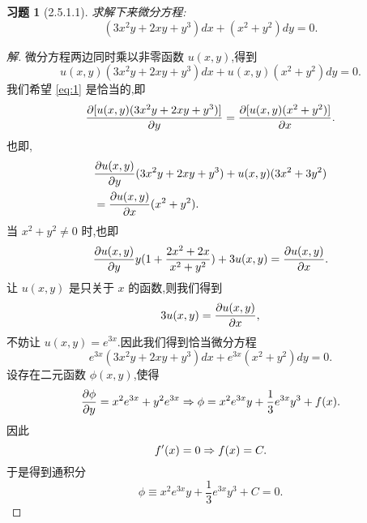 \documentclass[a4paper, 12pt]{article} %
\newtheorem*{cdtheorem}{习题}
\newenvironment{exercise}
{\bigskip\begin{mdframed}[backgroundcolor=gray!40,rightline=false,leftline=false,topline=false,bottomline=false]\begin{cdtheorem}}
    {\end{cdtheorem}\end{mdframed}\bigskip}
\begin{document}
\begin{exercise}[2.5.1.1]
求解下来微分方程:
$$
(3x^2y+2xy+y^3)dx+(x^2+y^2)dy=0.
$$
\end{exercise}
\begin{proof}[解]
微分方程两边同时乘以非零函数 $u(x,y)$,得到
\begin{equation}
  \label{eq:1}
  u(x,y)(3x^2y+2xy+y^3)dx+u(x,y)(x^2+y^2)dy=0.
\end{equation}
我们希望 \eqref{eq:1} 是恰当的,即
\begin{equation}
  \label{eq:2}
  \frac{\partial [u(x,y)(3x^2y+2xy+y^3)]}{\partial y}=\frac{\partial
    [u(x,y)(x^2+y^2)]}{\partial x}.
\end{equation}
也即,
\begin{align*}
&\frac{\partial u(x,y)}{\partial
  y}(3x^2y+2xy+y^3)+u(x,y)(3x^2+3y^2)\\&=\frac{\partial u(x,y)}{\partial x}(x^2+y^2).
\end{align*}
当 $x^2+y^2\neq 0$ 时,也即
$$
\frac{\partial u(x,y)}{\partial y}y(1+\frac{2x^2+2x}{x^2+y^2})+3u(x,y)=\frac{\partial
u(x,y)}{\partial x}.
$$
让 $u(x,y)$ 是只关于 $x$ 的函数,则我们得到
$$
3u(x,y)=\frac{\partial u(x,y)}{\partial x},
$$
不妨让 $u(x,y)=e^{3x}$.因此我们得到恰当微分方程
$$
e^{3x}(3x^2y+2xy+y^3)dx+e^{3x}(x^2+y^2)dy=0.
$$
设存在二元函数 $\phi(x,y)$,使得
\begin{equation}
  \label{eq:3}
  \frac{\partial\phi}{\partial y}=x^2e^{3x}+y^2e^{3x}\Rightarrow \phi=x^2e^{3x}y+\frac{1}{3}e^{3x}y^3+f(x).
\end{equation}
因此
\begin{equation}
  \label{eq:4}
  f'(x)=0\Rightarrow f(x)=C.
\end{equation}
于是得到通积分
\begin{equation}
  \label{eq:5}
  \phi\equiv x^2e^{3x}y+\frac{1}{3}e^{3x}y^3+C=0.
\end{equation}
\begin{comment}
我们发现做不下去了.因此我们考虑用分组法,怎么分组是个诀窍.我们发现
\begin{align*}
  (3x^2y+2xy+y^3)dx&=(2x^2y+2xy+x^2y+y^3)dx\\&=2xy(x+1)dx+y(x^2+y^2)dx.
\end{align*}
因此我们得到微分方程
\begin{equation}
  \label{eq:3}
  2xy(x+1)dx+y(x^2+y^2)dx+(x^2+y^2)dy=0.
\end{equation}
对于微分方程
\begin{equation}
  \label{eq:p}
  y(x^2+y^2)dx+(x^2+y^2)dy=0
\end{equation}
来说,当 $x^2+y^2\neq 0$ 且 $y\neq 0$ 时,易得积分因子为
$\frac{1}{y(x^2+y^2)}$,将积分因子乘以方程两侧,我们得到
$$
dx+\frac{1}{y}dy=0.
$$
因此可得通积分为
$$
\phi\equiv x+\ln |y|+C=0.
$$
易得 $\frac{1}{y(x^2+y^2)}g(x+\ln |y|)$ 也是微分方程 \eqref{eq:p} 的一
个积分因子,其中 $g$ 是可微函数.\\



\end{comment}
\end{proof}
\end{document}
